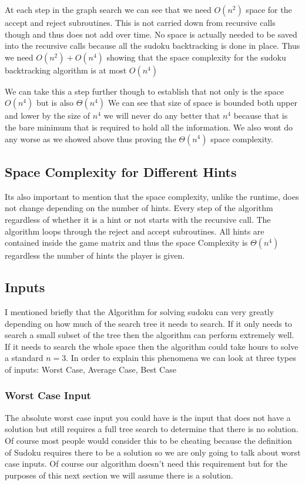 \documentclass{sig-alternate}
\begin{document}
At each step in the graph search we can see that we need $O(n^2)$ space for the accept and reject subroutines. This is not carried down from recursive calls though and thus does not add over time. No space is actually needed to be saved into the recursive calls because all the sudoku backtracking is done in place. Thus we need $O(n^2) + O(n^4)$ showing that the space complexity for the sudoku backtracking algorithm is at most $O(n^4)$

We can take this a step further though to establish that not only is the space $O(n^4)$ but is also $\Theta(n^4)$ We can see that size of space is bounded both upper and lower by the size of $n^4$ we will never do any better that $n^4$ because that is the bare minimum that is required to hold all the information. We also wont do any worse as we showed above thus proving the $\Theta(n^4)$ space complexity. 

\subsection{Space Complexity for Different Hints}
Its also important to mention that the space complexity, unlike the runtime, does not change depending on the number of hints. Every step of the algorithm regardless of whether it is a hint or not starts with the recursive call. The algorithm loops through the reject and accept subroutines. All hints are contained inside the game matrix and thus the space Complexity is $\Theta(n^4)$ regardless the number of hints the player is given. 

\subsection{Inputs} 

I mentioned briefly that the Algorithm for solving sudoku can very greatly depending on how much of the search tree it needs to search. If it only needs to search a small subset of the tree then the algorithm can perform extremely well. If it needs to search the whole space then the algorithm could take hours to solve a standard $n=3$. In order to explain this phenomena we can look at three types of inputs: Worst Case, Average Case, Best Case 


\subsubsection{Worst Case Input}
The absolute worst case input you could have is the input that does not have a solution but still requires a full tree search to determine that there is no solution. Of course most people would consider this to be cheating because the definition of Sudoku requires there to be a solution so we are only going to talk about worst case inputs. Of course our algorithm doesn't need this requirement but for the purposes of this next section we will assume there is a solution. 
\end{document}
